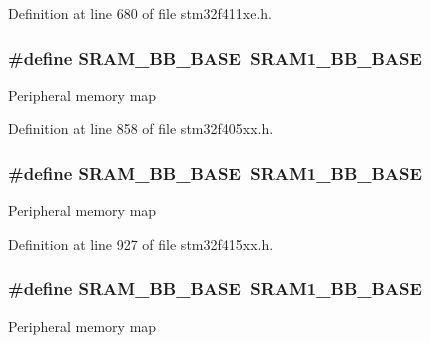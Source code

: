 Definition at line 680 of file stm32f411xe.\+h.

\subsubsection[{\texorpdfstring{S\+R\+A\+M\+\_\+\+B\+B\+\_\+\+B\+A\+SE}{SRAM_BB_BASE}}]{\setlength{\rightskip}{0pt plus 5cm}\#define S\+R\+A\+M\+\_\+\+B\+B\+\_\+\+B\+A\+SE~{\bf S\+R\+A\+M1\+\_\+\+B\+B\+\_\+\+B\+A\+SE}}\hypertarget{group___peripheral__registers__structures_gad3548b6e2f017f39d399358f3ac98454}{}\label{group___peripheral__registers__structures_gad3548b6e2f017f39d399358f3ac98454}
Peripheral memory map 

Definition at line 858 of file stm32f405xx.\+h.

\subsubsection[{\texorpdfstring{S\+R\+A\+M\+\_\+\+B\+B\+\_\+\+B\+A\+SE}{SRAM_BB_BASE}}]{\setlength{\rightskip}{0pt plus 5cm}\#define S\+R\+A\+M\+\_\+\+B\+B\+\_\+\+B\+A\+SE~{\bf S\+R\+A\+M1\+\_\+\+B\+B\+\_\+\+B\+A\+SE}}\hypertarget{group___peripheral__registers__structures_gad3548b6e2f017f39d399358f3ac98454}{}\label{group___peripheral__registers__structures_gad3548b6e2f017f39d399358f3ac98454}
Peripheral memory map 

Definition at line 927 of file stm32f415xx.\+h.

\subsubsection[{\texorpdfstring{S\+R\+A\+M\+\_\+\+B\+B\+\_\+\+B\+A\+SE}{SRAM_BB_BASE}}]{\setlength{\rightskip}{0pt plus 5cm}\#define S\+R\+A\+M\+\_\+\+B\+B\+\_\+\+B\+A\+SE~{\bf S\+R\+A\+M1\+\_\+\+B\+B\+\_\+\+B\+A\+SE}}\hypertarget{group___peripheral__registers__structures_gad3548b6e2f017f39d399358f3ac98454}{}\label{group___peripheral__registers__structures_gad3548b6e2f017f39d399358f3ac98454}
Peripheral memory map 

